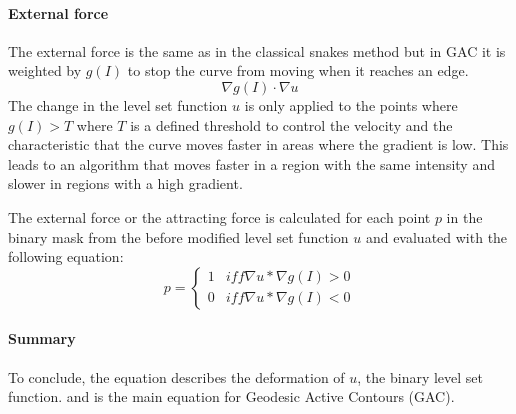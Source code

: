\paragraph{External force}
The external force is the same as in the classical snakes method but in GAC it is weighted by $g(I)$ to stop the curve from moving when it reaches an edge.
\begin{equation}
    \nabla g(I) \cdot \nabla u
\end{equation}
The change in the level set function $u$ is only applied to the points where $g(I) > T$ where $T$ is a defined threshold to control the velocity and the characteristic that the curve moves faster in areas where the gradient is low. This leads to an algorithm that moves faster in a region with the same intensity and slower in regions with a high gradient. 

The external force or the attracting force is calculated for each point $p$ in the binary mask from the before modified level set function $u$ and evaluated with the following equation:
\begin{equation}
    p = \begin{cases}
        1 &iff  \nabla u * \nabla g(I) > 0 \\
        0 &iff \nabla u * \nabla g(I) < 0
    \end{cases}
    \label{eq:externalforce}
\end{equation}
\paragraph{Summary}
To conclude, the equation  describes the deformation of $u$, the binary level set function. and is the main equation for Geodesic Active Contours (GAC). 

